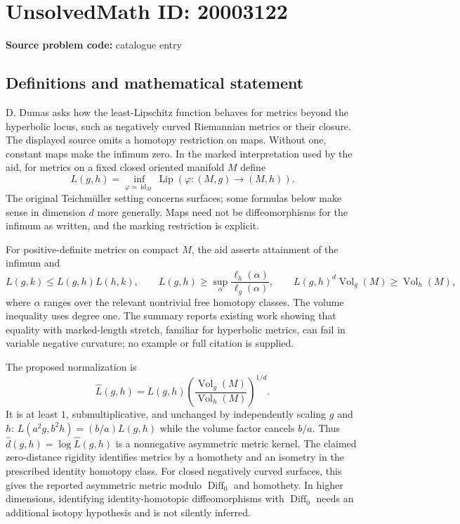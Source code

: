 \documentclass[11pt]{article}
\begin{document}
\section*{UnsolvedMath ID: 20003122}
\textbf{Source problem code:} catalogue entry
\subsection{Definitions and mathematical statement}
D. Dumas asks how the least-Lipschitz function behaves for metrics beyond the hyperbolic locus, such as negatively curved Riemannian metrics or their closure. The displayed source omits a homotopy restriction on maps. Without one, constant maps make the infimum zero. In the marked interpretation used by the aid, for metrics on a fixed closed oriented manifold $M$ define
\[
L(g,h)=\inf_{\varphi\simeq\operatorname{id}_M}\operatorname{Lip}(\varphi:(M,g)\to(M,h)).
\]
The original Teichm\"uller setting concerns surfaces; some formulas below make sense in dimension $d$ more generally. Maps need not be diffeomorphisms for the infimum as written, and the marking restriction is explicit.

For positive-definite metrics on compact $M$, the aid asserts attainment of the infimum and
\[
L(g,k)\leq L(g,h)L(h,k),\qquad
L(g,h)\geq\sup_\alpha\frac{\ell_h(\alpha)}{\ell_g(\alpha)},\qquad
L(g,h)^d\operatorname{Vol}_g(M)\geq\operatorname{Vol}_h(M),
\]
where $\alpha$ ranges over the relevant nontrivial free homotopy classes. The volume inequality uses degree one. The summary reports existing work showing that equality with marked-length stretch, familiar for hyperbolic metrics, can fail in variable negative curvature; no example or full citation is supplied.

The proposed normalization is
\[
\widehat L(g,h)=L(g,h)\left(\frac{\operatorname{Vol}_g(M)}{\operatorname{Vol}_h(M)}\right)^{1/d}.
\]
It is at least $1$, submultiplicative, and unchanged by independently scaling $g$ and $h$: $L(a^2g,b^2h)=(b/a)L(g,h)$ while the volume factor cancels $b/a$. Thus $\widehat d(g,h)=\log\widehat L(g,h)$ is a nonnegative asymmetric metric kernel. The claimed zero-distance rigidity identifies metrics by a homothety and an isometry in the prescribed identity homotopy class. For closed negatively curved surfaces, this gives the reported asymmetric metric modulo $\operatorname{Diff}_0$ and homothety. In higher dimensions, identifying identity-homotopic diffeomorphisms with $\operatorname{Diff}_0$ needs an additional isotopy hypothesis and is not silently inferred.
\end{document}
